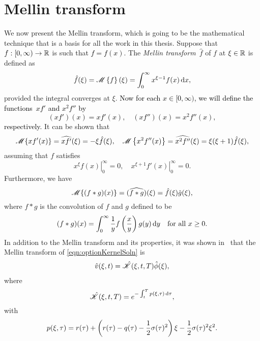 \section{Mellin transform}
\label{subsec:mellin}
We now present the Mellin transform, which is going to be the mathematical technique that is a basis for all the work in this thesis. Suppose that $f : [0,\infty) \rightarrow \mathbb R$ is such that \textcolor{black}{$f = f(x)$}. The {\em Mellin transform}~$\hat f$ of $f$ at $\xi \in \mathbb R$ is defined as
\begin{equation*}
\hat f(\xi) =  \textcolor{black}{\mathscr M\left\{ f \right\}(\xi)} = \int_0^\infty x^{\xi - 1} f(x) \, \mathrm d x,
\end{equation*}
provided the integral converges at $\xi$. \textcolor{black}{Now for each $x \in [0,\infty)$, we will define the functions~$x f'$ and $x^2f''$ by
\begin{equation*}
(xf')(x) = x f'(x), \quad (x f'')(x) = x^2 f''(x),
\end{equation*}
respectively.} It can be shown that \cite[pp. 362--363]{Myint1987}
\begin{equation}
\label{eqn:mellinDiv}
\mathscr M\{ xf'(x) \} = \widehat{x f'}(\xi) = -\xi \hat f(\xi), \quad \mathscr M\left\{ x^2f''(x) \right\} = \widehat{x^2 f''}(\xi) = \xi (\xi + 1) \hat f(\xi),
\end{equation}
assuming that $f$ satisfies
\begin{equation*}
\left. x^\xi f(x) \right\vert_0^\infty = 0, \quad \left. x^{\xi + 1} f'(x) \right\vert_0^\infty = 0.
\end{equation*}
Furthermore, we have
	\begin{equation*}
		\mathscr M\{ (f \ast g)(x) \} = (\widehat{f \ast g})(\xi) = \hat f(\xi) \hat g(\xi),
	\end{equation*}
where $f \ast g$ is the convolution of $f$ and $g$ defined to be
	\begin{equation*}
		(f \ast g)(x) = \int_0^\infty \frac{1}{y}f\left(\frac{x}{y}\right)g(y) \, \mathrm d y \quad \text{for all } x \geq 0.
	\end{equation*}
In addition to the Mellin transform and its properties, it was shown in~\cite{Rodrigo2006} that the Mellin transform of \eqref{eqn:optionKernelSoln} is
\begin{align}
		\label{eqn:mellinVkernel}
		\begin{split}
		\hat v(\xi,t) &= \hat {\mathscr K}(\xi,t,T) \hat \phi(\xi), \\
		\end{split}
	\end{align}
where 
\begin{equation}
	\label{eqn:KhatA}
 \hat{\mathscr K}(\xi,t,T) = e^{-\int_t^T p(\xi,\tau) \,  \mathrm d\tau},
 \end{equation} 
with
	\begin{equation}
		\label{eqn:Khat}
		p(\xi,\tau) = r(\tau) + \left( r(\tau) - q(\tau) - \frac{1}{2}\sigma(\tau)^2 \right)\xi - \frac{1}{2}\sigma(\tau)^2\xi^2.
	\end{equation}

